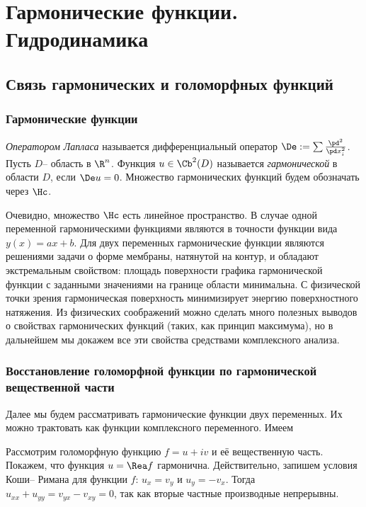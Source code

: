 \documentclass[a4paper]{article}
\begin{document}
\pagebreak

\section{Гармонические функции. Гидродинамика}

\subsection{Связь гармонических и голоморфных функций}

\subsubsection{Гармонические функции}

\begin{df}
\emph{Оператором Лапласа} называется дифференциальный оператор $\De := \sum \frac{\pd^2}{\pd x_i^2}$.
Пусть $D$-- область в $\R^n$. Функция $u\in \Cb^2(D)$ называется \emph{гармонической} в области $D$,
если $\De u = 0$. Множество гармонических функций будем обозначать через $\Hc$.
\end{df}

Очевидно, множество $\Hc$ есть линейное пространство. В случае одной переменной гармоническими функциями
являются в точности функции вида $y(x) = ax+b$. Для двух переменных гармонические функции являются решениями
задачи о форме мембраны, натянутой на контур, и обладают экстремальным  свойством:
площадь поверхности графика гармонической функции с заданными значениями на границе области минимальна.
С физической точки зрения гармоническая поверхность минимизирует энергию поверхностного натяжения. Из
физических соображений можно сделать много полезных выводов о свойствах гармонических функций (таких, как
принцип максимума), но в дальнейшем мы докажем все эти свойства средствами комплексного анализа.

\subsubsection{Восстановление голоморфной функции по гармонической вещественной части}

Далее мы будем рассматривать гармонические функции двух переменных. Их можно трактовать как функции комплексного
переменного. Имеем

Рассмотрим голоморфную функцию $f=u+iv$ и её вещественную часть. Покажем, что функция $u = \Rea f$ гармонична.
Действительно, запишем условия Коши-- Римана для функции $f$: $u_x = v_y$ и $u_y=-v_x$. Тогда
$u_{xx} + u_{yy}=v_{yx}-v_{xy}=0$, так как вторые частные производные непрерывны.
\end{document}
